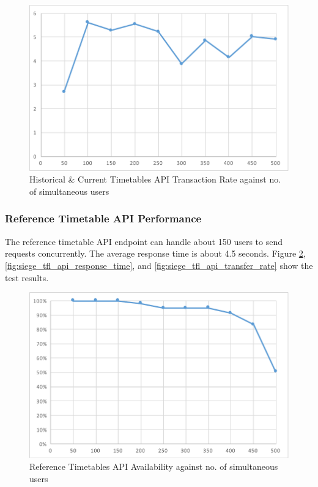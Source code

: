 \begin{figure}
\centering
\includegraphics[width=\textwidth]{figures/siege_predictions_api_transfer_rate_against_users.pdf}
\caption{\label{fig:siege_pre_api_transfer_rate} Historical \& Current Timetables API Transaction Rate against no. of simultaneous users}
\end{figure}

\subsubsection{Reference Timetable API Performance}
\par The reference timetable API endpoint can handle about 150 users to send requests concurrently. The average response time is about 4.5 seconds. Figure \ref{fig:siege_tfl_api_availability}, \ref{fig:siege_tfl_api_response_time}, and \ref{fig:siege_tfl_api_transfer_rate} show the test results.

\begin{figure}
\centering
\includegraphics[width=\textwidth]{figures/siege_tfl_api_availability_against_users.pdf}
\caption{\label{fig:siege_tfl_api_availability} Reference Timetables API Availability against no. of simultaneous users}
\end{figure}

